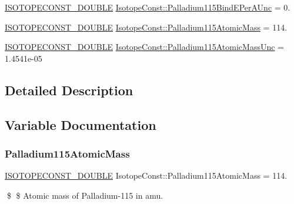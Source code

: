 \begin{DoxyCompactItemize}
\mbox{\hyperlink{group___isotope_const-_macros_ga8f45a7272ce02c0b4c65c44636ed719a}{I\+S\+O\+T\+O\+P\+E\+C\+O\+N\+S\+T\+\_\+\+D\+O\+U\+B\+LE}} \mbox{\hyperlink{group___isotope_const-_palladium-_pd115_ga87f261fa0f390cc2a23954f1e34c1952}{Isotope\+Const\+::\+Palladium115\+Bind\+E\+Per\+A\+Unc}} = 0.
\item 
\mbox{\hyperlink{group___isotope_const-_macros_ga8f45a7272ce02c0b4c65c44636ed719a}{I\+S\+O\+T\+O\+P\+E\+C\+O\+N\+S\+T\+\_\+\+D\+O\+U\+B\+LE}} \mbox{\hyperlink{group___isotope_const-_palladium-_pd115_gaa40ea10b92d727ea0a684edee643e3cb}{Isotope\+Const\+::\+Palladium115\+Atomic\+Mass}} = 114.
\item 
\mbox{\hyperlink{group___isotope_const-_macros_ga8f45a7272ce02c0b4c65c44636ed719a}{I\+S\+O\+T\+O\+P\+E\+C\+O\+N\+S\+T\+\_\+\+D\+O\+U\+B\+LE}} \mbox{\hyperlink{group___isotope_const-_palladium-_pd115_ga8173b6bafe9ebb73ee7a125bab4f9855}{Isotope\+Const\+::\+Palladium115\+Atomic\+Mass\+Unc}} = 1.\+4541e-\/05
\end{DoxyCompactItemize}


\subsection{Detailed Description}


\subsection{Variable Documentation}
\mbox{\label{group___isotope_const-_palladium-_pd115_gaa40ea10b92d727ea0a684edee643e3cb}} 
\subsubsection{\texorpdfstring{Palladium115\+Atomic\+Mass}{Palladium115AtomicMass}}
{\footnotesize\ttfamily \mbox{\hyperlink{group___isotope_const-_macros_ga8f45a7272ce02c0b4c65c44636ed719a}{I\+S\+O\+T\+O\+P\+E\+C\+O\+N\+S\+T\+\_\+\+D\+O\+U\+B\+LE}} Isotope\+Const\+::\+Palladium115\+Atomic\+Mass = 114.}

\$ \$ Atomic mass of Palladium-\/115 in amu. \mbox{\label{group___isotope_const-_palladium-_pd115_ga8173b6bafe9ebb73ee7a125bab4f9855}} 
